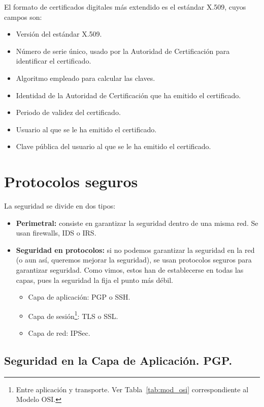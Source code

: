 El formato de certificados digitales más extendido es el estándar X.509, cuyos campos son:
\begin{itemize}
    \item Versión del estándar X.509.
    \item Número de serie único, usado por la Autoridad de Certificación para identificar el certificado.
    \item Algoritmo empleado para calcular las claves.
    \item Identidad de la Autoridad de Certificación que ha emitido el certificado.
    \item Periodo de validez del certificado.
    \item Usuario al que se le ha emitido el certificado.
    \item Clave pública del usuario al que se le ha emitido el certificado.
\end{itemize}

\section{Protocolos seguros}
La seguridad se divide en dos tipos:
\begin{itemize}
    \item \textbf{Perimetral:} consiste en garantizar la seguridad dentro de una misma red. Se usan firewalls, \acrfull{IDS} o \acrfull{IRS}.
    
    \item \textbf{Seguridad en protocolos:} si no podemos garantizar la seguridad en la red (o aun así, queremos mejorar la seguridad), se usan protocolos seguros para garantizar seguridad. Como vimos, estos han de establecerse en todas las capas, pues la seguridad la fija el punto más débil.
    \begin{itemize}
        \item Capa de aplicación: \acrshort{PGP} o \acrshort{SSH}.
        \item Capa de sesión\footnote{Entre aplicación y transporte. Ver Tabla~\ref{tab:mod_osi} correspondiente al Modelo \acrshort{OSI}.}: \acrshort{TLS} o \acrshort{SSL}.
        \item Capa de red: \acrshort{IPSec}.
    \end{itemize}
\end{itemize}

\subsection{Seguridad en la Capa de Aplicación. \acrshort{PGP}.}

